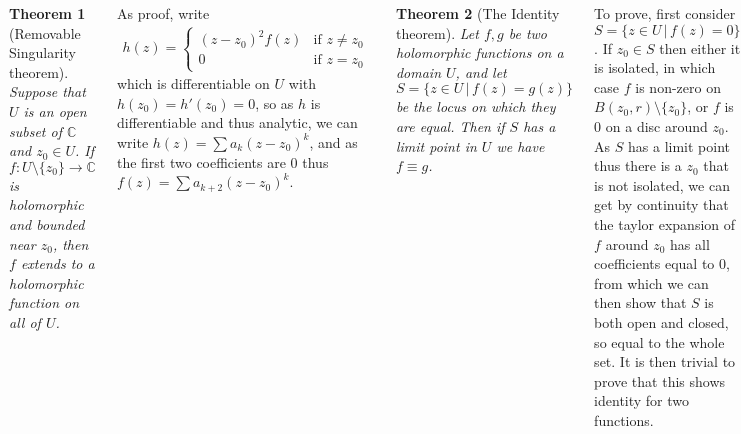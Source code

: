 \documentclass{tikzposter} %
\newtheorem{theorem}{Theorem}
\newtheorem{lemma}[theorem]{Lemma}
\begin{document}
\begin{columns}
{  \begin{theorem}[Removable Singularity theorem]
    Suppose that $U$ is an open subset of $\mathbb{C}$ and $z_{0} \in U$. If $f : U \setminus \{z_{0}\} \to \mathbb{C}$ is holomorphic and bounded near $z_{0}$, then $f$ extends to a holomorphic function on all of $U$.
  \end{theorem}
  \hphantom{}

  As proof, write
  \begin{align*}
    h(z) = \begin{cases}
             (z - z_{0})^{2}f(z) & \text{if $z \neq z_{0}$} \\
             0 & \text{if $z = z_0$}
           \end{cases}
  \end{align*}
  which is differentiable on $U$ with $h(z_{0}) = h'(z_{0}) = 0$, so as $h$ is differentiable and thus analytic, we can write $h(z) = \sum a_{k}(z-z_{0})^{k}$, and as the first two coefficients are $0$ thus $f(z) = \sum a_{k+2} (z - z_{0})^{k}$. \\

  \begin{theorem}[The Identity theorem]
    Let $f, g$ be two holomorphic functions on a domain $U$, and let $S = \{z \in U \,|\, f(z) = g(z)\}$ be the locus on which they are equal. Then if $S$ has a limit point in $U$ we have $f \equiv g$.
  \end{theorem}
  \hphantom{}

  To prove, first consider $S = \{z \in U \,|\, f(z) = 0\}$. If $z_{0} \in S$ then either it is isolated, in which case $f$ is non-zero on $B(z_{0}, r) \setminus \{z_{0}\}$, or $f$ is $0$ on a disc around $z_{0}$. As $S$ has a limit point thus there is a $z_{0}$ that is not isolated, we can get by continuity that the taylor expansion of $f$ around $z_{0}$ has all coefficients equal to $0$, from which we can then show that $S$ is both open and closed, so equal to the whole set. It is then trivial to prove that this shows identity for two functions. \\

  \begin{lemma}[Counting Zeros]
    For $f$ holomorphic inside and on a positively oriented closed path, if $f$ is non-zero on $\gamma$, then the number of zeros of $f$ in $\gamma$ (counting multiplicities) is
    \begin{align*}
      \frac{1}{2\pi i} \int_{\gamma} \frac{f'(z)}{f(z)} \, \mathrm{d}z
    \end{align*}
  \end{lemma}
  \hphantom{}

}
\end{columns}
\end{document}
